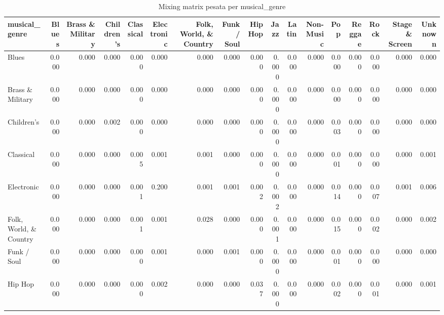 \begin{table}
\centering
\caption{Mixing matrix pesata per musical_genre}
\label{tab:t3_mixing_genere_musicale_pesata}
\begin{tabular}{lrrrrrrrrrrrrrrrr}
\toprule
         musical\_genre &  Blues &  Brass \& Military &  Children's &  Classical &  Electronic &  Folk, World, \& Country &  Funk / Soul &  Hip Hop &  Jazz &  Latin &  Non-Music &   Pop &  Reggae &  Rock &  Stage \& Screen &  Unknown \\
\midrule
                 Blues &  0.000 &             0.000 &       0.000 &      0.000 &       0.000 &                   0.000 &        0.000 &    0.000 & 0.000 &  0.000 &      0.000 & 0.000 &   0.000 & 0.000 &           0.000 &    0.000 \\
      Brass \& Military &  0.000 &             0.000 &       0.000 &      0.000 &       0.000 &                   0.000 &        0.000 &    0.000 & 0.000 &  0.000 &      0.000 & 0.000 &   0.000 & 0.000 &           0.000 &    0.000 \\
            Children's &  0.000 &             0.000 &       0.002 &      0.000 &       0.000 &                   0.000 &        0.000 &    0.000 & 0.000 &  0.000 &      0.000 & 0.003 &   0.000 & 0.000 &           0.000 &    0.000 \\
             Classical &  0.000 &             0.000 &       0.000 &      0.005 &       0.001 &                   0.001 &        0.000 &    0.000 & 0.000 &  0.000 &      0.000 & 0.001 &   0.000 & 0.000 &           0.000 &    0.001 \\
            Electronic &  0.000 &             0.000 &       0.000 &      0.001 &       0.200 &                   0.001 &        0.001 &    0.002 & 0.002 &  0.000 &      0.000 & 0.014 &   0.000 & 0.007 &           0.001 &    0.006 \\
Folk, World, \& Country &  0.000 &             0.000 &       0.000 &      0.001 &       0.001 &                   0.028 &        0.000 &    0.000 & 0.001 &  0.000 &      0.000 & 0.015 &   0.000 & 0.002 &           0.000 &    0.002 \\
           Funk / Soul &  0.000 &             0.000 &       0.000 &      0.000 &       0.001 &                   0.000 &        0.001 &    0.000 & 0.000 &  0.000 &      0.000 & 0.001 &   0.000 & 0.000 &           0.000 &    0.000 \\
               Hip Hop &  0.000 &             0.000 &       0.000 &      0.000 &       0.002 &                   0.000 &        0.000 &    0.037 & 0.000 &  0.000 &      0.000 & 0.002 &   0.000 & 0.001 &           0.000 &    0.001 \\

\end{tabular}
\end{table}
